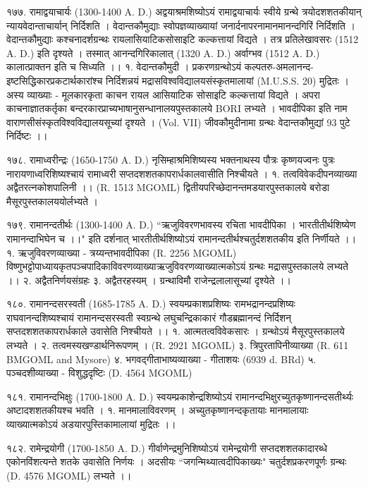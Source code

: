 १७७. रामाद्वयाचार्यः (1300-1400 A. D.)
अद्वयाश्रमशिष्योऽयं रामाद्वयाचार्यः स्वीये ग्रन्थे त्रयोदशशतकीयान् न्यायवेदान्ताचार्यान् निर्दिशति । वेदान्तकौमुद्याः स्वोपज्ञव्याख्यायां जनार्दनापरनामानमानन्दगिरिं निर्दिशति । वेदान्तकौमुद्याः कश्चनादर्शग्रन्थः रायलासियाटिकसोसाइटि कल्कत्तायां विद्यते । तत्र प्रतिलेखावसरः (1512 A. D.) इति दृश्यते । तस्मात् आनन्दगिरिकालात् (1320 A. D.) अर्वाग्भव (1512 A. D.) कालात्प्राक्तन इति च सिध्यति ।।
१. वेदान्तकौमुदी । प्रकरणग्रन्थोऽयं कल्पतरु-अमलानन्द-इष्टसिद्धिकारप्रकटार्थकारांश्च निर्दिशन्नयं मद्रासविश्वविद्यालयसंस्कृतमालायां (M.U.S.S. 20) मुद्रितः । 
अस्य व्याख्याः - मूलकारकृता काचन रायल आसियाटिक सोसाइटि कल्कत्तायां विद्यते । अपरा काचनाज्ञातकर्तृका बन्दरकारप्राच्यभाषानुसन्धानालयपुस्तकालये BORI लभ्यते । भावदीपिका इति नाम वाराणसीसंस्कृतविश्वविद्यालयसूच्यां दृश्यते । (Vol. VII) जीवकौमुदीनामा ग्रन्थः वेदान्तकौमुद्यां 93 पुटे निर्दिष्टः ।।

१७८. रामाध्वरीन्द्रः (1650-1750 A. D.)
नृसिम्हाश्रमिशिष्यस्य भक्तनाथस्य पौत्रः कृष्णयज्वनः पुत्रः नारायणाध्वरिशिष्यश्चायं रामाध्वरी सप्तदशशतकापरार्धकालवासीति निश्चीयते ।
१. तत्वविवेकदीपनव्याख्या अद्वैतरत्नकोशपालिनी ।। (R. 1513 MGOML) द्वितीयपरिच्छेदानन्तमडयारपुस्तकालये बरोडा मैसूरपुस्तकालययोर्लभ्यते ।

१७९. रामानन्दतीर्थः (1300-1400 A. D.) 
``ऋजुविवरणभावस्य रचिता भावदीपिका । भारतीतीर्थशिष्येण रामानन्दाभिघेन च ।।" इति दर्शनात् भारतीतीर्थशिष्योऽयं रामानन्दतीर्थश्चतुर्दशशतकीय इति निर्णीयते ।।
१. ऋजुविवरणव्याख्या - त्रय्यन्तभावदीपिका (R. 2256 MGOML) विष्णुभट्टोपाध्यायकृतपञ्चपादिकाविवरणव्याख्याऋजुविवरणव्याख्यात्मकोऽयं ग्रन्थः मद्रासपुस्तकालये लभ्यते ।।
२. अद्वैतनिर्णयसंग्रहः
३. अद्वैतरहस्यम् । ग्रन्थाविमौ राजेन्द्रलालासूच्यां दृश्येते ।।

१८०. रामानन्दसरस्वती (1685-1785 A. D.)
स्वयम्प्रकाशप्रशिष्यः रामभद्रानन्दप्रशिष्यः राघवानन्दशिष्यश्चायं रामानन्दसरस्वती स्वग्रन्थे लघुचन्द्रिकाकारं गौडब्रह्मानन्दं निर्दिशन् सप्तदशशतकापरार्धकाले उवासेति निश्चीयते ।।
१. आत्मतत्वविवेकसारः । ग्रन्थोऽयं मैसूरपुस्तकालये लभ्यते ।
२. तत्वमस्यखण्डार्थनिरूपणम् । (R. 2921 MGOML)
३. त्रिपुरतापिनीव्याख्या (R. 611 BMGOML and Mysore)
४. भगवद्गीताभाष्यव्याख्या - गीताशयः (6939 d. BRd)
५. पञ्चदशीव्याख्या - विशुद्धदृष्टिः (D. 4564 MGOML)

१८१. रामानन्दभिक्षुः (1700-1800 A. D.)
स्वयम्प्रकाशेन्द्रशिष्योऽयं रामानन्दभिक्षुरच्युतकृष्णानन्दसतीर्थ्यः अष्टादशशतकीयश्च भवति ।
१. मानमालाविवरणम् । अच्युतकृष्णानन्दकृतायाः मानमालायाः व्याख्यात्मकोऽयं अडयारपुस्तिकामालायां मुद्रितः ।।

१८२. रामेन्द्रयोगी (1700-1850 A. D.)
गीर्वाणेन्द्रमुनिशिष्योऽयं रामेन्द्रयोगी सप्तदशशतकादारब्धे एकोनविंशत्यन्ते शतके उवासेति निर्णयः । अदसीयः ``जगन्मिथ्यात्वदीपिकाख्यः" चतुर्दशप्रकरणपूर्णः ग्रन्थः (D. 4576 MGOML) लभ्यते ।। 

